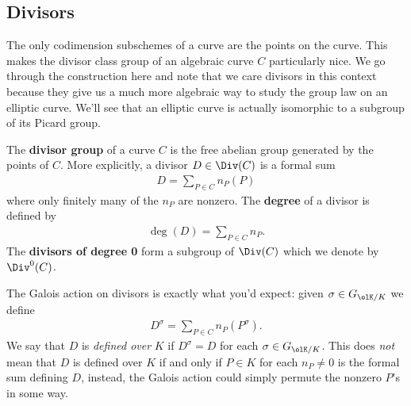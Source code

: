\subsection{Divisors}
The only codimension subschemes of a curve are the points on the curve. This makes the divisor class group of an algebraic curve $C$ particularly nice. We go through the construction here and note that we care divisors in this context because they give us a much more algebraic way to study the group law on an elliptic curve. We'll see that an elliptic curve is actually isomorphic to a subgroup of its Picard group.
\begin{defn}\label{defn:divisor-group-of-curve}
	The \textbf{divisor group} of a curve $C$ is the free abelian group generated by the points of $C$. More explicitly, a divisor $D \in \Div(C)$ is a formal sum
	\begin{align*}
		D = \sum_{P \in C} n_P(P)
	\end{align*}
	where only finitely many of the $n_P$ are nonzero. The \textbf{degree} of a divisor is defined by
	\begin{align*}
		\deg(D) = \sum_{P\in C} n_P.
	\end{align*}
	The \textbf{divisors of degree 0} form a subgroup of $\Div(C)$ which we denote by $\Div^0(C)$.
\end{defn}
The Galois action on divisors is exactly what you'd expect: given $\sigma \in G_{\olK/K}$ we define
\begin{align*}
	D^\sigma = \sum_{ P\in C } n_P(P^\sigma).
\end{align*}
We say that $D$ is \emph{defined over} $K$ if $D^\sigma = D$ for each $\sigma \in G_{\olK/K}$. This does \emph{not} mean that $D$ is defined over $K$ if and only if $P \in K$ for each $n_P \neq 0$ is the formal sum defining $D$, instead, the Galois action could simply permute the nonzero  $P$'s in some way.

